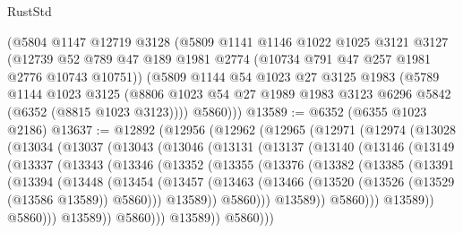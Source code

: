 \begin{lexlean}{RustStd}
\begin{coremodule}
    (@5804
      @1147
      @12719
      @3128
      (@5809
        @1141
        @1146
        @1022
        @1025
        @3121
        @3127
        (@12739 @52 @789 @47 @189 @1981 @2774 (@10734 @791 @47 @257 @1981 @2776 @10743 @10751))
        (@5809
          @1144
          @54
          @1023
          @27
          @3125
          @1983
          (@5789
            @1144
            @1023
            @3125
            (@8806 @1023 @54 @27 @1989 @1983 @3123 @6296 @5842 (@6352 (@8815 @1023 @3123))))
          @5860)))
@13589 := @6352 (@6355 @1023 @2186)
@13637 := @12892
    (@12956
      (@12962
        (@12965
          (@12971
            (@12974
              (@13028
                (@13034
                  (@13037
                    (@13043
                      (@13046
                        (@13131
                          (@13137
                            (@13140
                              (@13146
                                (@13149
                                  (@13337
                                    (@13343
                                      (@13346
                                        (@13352
                                          (@13355
                                            (@13376
                                              (@13382
                                                (@13385
                                                  (@13391
                                                    (@13394
                                                      (@13448
                                                        (@13454
                                                          (@13457
                                                            (@13463
                                                              (@13466
                                                                (@13520
                                                                  (@13526
                                                                    (@13529 (@13586 @13589))
                                                                    @5860)))
                                                              @13589))
                                                          @5860)))
                                                    @13589))
                                                @5860)))
                                          @13589))
                                      @5860)))
                                @13589))
                            @5860)))
                      @13589))
                  @5860)))

\end{coremodule}
\end{lexlean}
